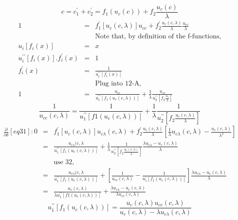 \documentclass[]{article}
\begin{document}
\begin{equation}
c = c_1^\prime + c_2^\prime = f_1(u_c(c)) + f_2\frac{u_c(c)}{\lambda} \tag{31}
\end{equation}
\begin{eqnarray*}
1 &=& f_1^\prime [u_c(c,\lambda)] u_{cc} + f_2^\prime \frac{u_c(c,\lambda)}{\lambda} \frac{u_{cc}}{\lambda}\\
&& \mbox{Note that, by definition of the f-functions,}\\
u_i[f_i(x)] &=& x\\
u_i^{\prime\prime} [f_i(x)] . f_i^\prime(x) &=& 1\\
f_i^\prime(x) &=& \frac{1}{u_i^{\prime\prime}[f_i(x)]}\\
&&\mbox{Plug into 12-A,}\\
1&=& \frac{u_{cc}}{u_1^{\prime\prime}[f_1(u_c(c,\lambda))]} + \frac{1}{\lambda} \frac{u_{cc}}{u_2^{\prime\prime} [f_2\frac{u_c}{\lambda}]}
\end{eqnarray*}
\begin{equation}
\frac{1}{u_{cc}(c,\lambda)} = \frac{1}{u_1^{\prime\prime}[f1(u_c(c,\lambda))]} + \frac{1}{\lambda} \frac{1}{u_2^{\prime\prime} [f_2\frac{u_c(c,\lambda)}{\lambda}]} \tag{32}
\end{equation}
\begin{eqnarray*}
\frac{\partial}{\partial \delta}[eq31] : 0 &=& f_1^\prime [u_c(c,\lambda)] u_{c\lambda} (c,\lambda) + f_2^\prime \frac{u_c(c,\lambda)}{\lambda} \left[\frac{1}{\lambda} u_{c\lambda}(c,\lambda) - \frac{u_c(c,\lambda)}{\lambda^2}\right]\\
&=& \frac{u_{c\lambda}(c,\lambda}{u_1^{\prime\prime}[f_1(u_c(c,\lambda))]} + \frac{1}{\lambda} \frac{1}{u_2^{\prime\prime}[f_2\frac{u_c(c,\lambda)}{\lambda}]} \frac{\lambda u_{c\lambda} - u_c(c,\lambda)}{\lambda}\\
&& \mbox{use 32,}\\
&=& \frac{u_{c\lambda}(c,\lambda}{u_1^{\prime\prime}[f_1(u_c(c,\lambda))]} + \left[\frac{1}{u_{cc}(c,\lambda)} - \frac{1}{u_1^\prime [f_1(u_c(c,\lambda))]}\right] \frac{\lambda u_{c\lambda} - u_c(c,\lambda)}{\lambda}\\
&=& \frac{u_c(c,\lambda)}{\lambda u_1^{\prime\prime}[f1(u_c(c,\lambda))]}+\frac{\lambda u_{c\lambda} - u_c(c,\lambda)}{\lambda u_{cc}(c,\lambda)}
\end{eqnarray*}
\begin{equation}
u_1^{\prime\prime} [f_1(u_c(c,\lambda))] = \frac{u_c(c,\lambda) u_{cc}(c,\lambda)}{u_c(c,\lambda)-\lambda u_{c\lambda}(c,\lambda)} \tag{33}
\end{equation}
\end{document}
